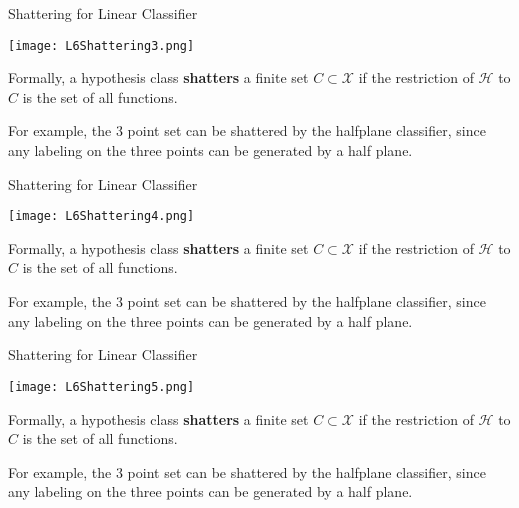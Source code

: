 \documentclass[10pt, table, dvipsnames, handout]{beamer}
\newcommand{\cX}{\ensuremath{\mathcal{X}}}
\newcommand{\cH}{\ensuremath{\mathcal{H}}}
\begin{document}
\begin{frame}[fragile]{Shattering for Linear Classifier}
  \begin{minipage}[t][0.6\textheight][t]{\textwidth}
	\centering \texttt{[image: L6Shattering3.png]} 
  \end{minipage}
  \vfill
  \begin{minipage}[t][0.4\textheight][t]{\textwidth}
Formally, a hypothesis class \textbf{shatters} a finite set $C\subset\cX$ if the restriction of $\cH$ to $C$ is the set of all functions. 

For example, the 3 point set can be shattered by the halfplane classifier, since any labeling on the three points can be generated by a half plane.
\end{minipage}

\end{frame}



\begin{frame}[fragile]{Shattering for Linear Classifier}
  \begin{minipage}[t][0.6\textheight][t]{\textwidth}
	\centering \texttt{[image: L6Shattering4.png]} 
  \end{minipage}
  \vfill
  \begin{minipage}[t][0.4\textheight][t]{\textwidth}
Formally, a hypothesis class \textbf{shatters} a finite set $C\subset\cX$ if the restriction of $\cH$ to $C$ is the set of all functions. 

For example, the 3 point set can be shattered by the halfplane classifier, since any labeling on the three points can be generated by a half plane.
\end{minipage}

\end{frame}



\begin{frame}[fragile]{Shattering for Linear Classifier}
  \begin{minipage}[t][0.6\textheight][t]{\textwidth}
	\centering \texttt{[image: L6Shattering5.png]} 
  \end{minipage}
  \vfill
  \begin{minipage}[t][0.4\textheight][t]{\textwidth}
Formally, a hypothesis class \textbf{shatters} a finite set $C\subset\cX$ if the restriction of $\cH$ to $C$ is the set of all functions. 

For example, the 3 point set can be shattered by the halfplane classifier, since any labeling on the three points can be generated by a half plane.
\end{minipage}

\end{frame}
\end{document}
